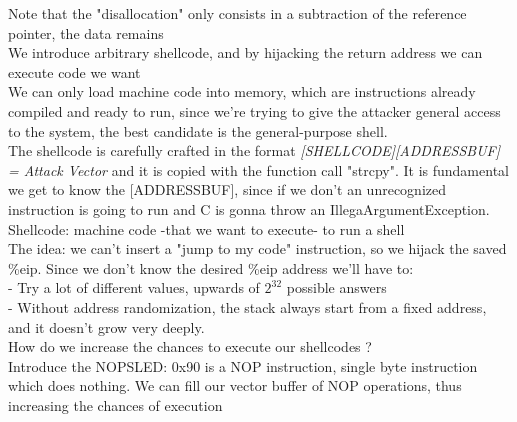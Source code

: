 \documentclass[11pt, oneside]{article}   	%
\begin{document}
{\footnotesize Note that the "disallocation" only consists in a subtraction of the reference pointer, the data remains\\
We introduce arbitrary shellcode, and by hijacking the return address we can execute code we want}\\
We can only load machine code into memory, which are instructions already compiled and ready to run, since we're trying to give the attacker general access to the system, the best candidate is the general-purpose shell. \\The shellcode is carefully crafted in the format \emph{[SHELLCODE][ADDRESSBUF] = Attack Vector} and it is copied with the function call "strcpy".
It is fundamental we get to know the [ADDRESSBUF], since if we don't an unrecognized instruction is going to run and C is gonna throw an IllegaArgumentException.\\
{\footnotesize Shellcode: machine code -that we want to execute- to run a shell}\\
The idea: we can't insert a "jump to my code" instruction, so we hijack the saved \%eip. Since we don't know the desired \%eip address we'll have to:\\
- Try a lot of different values, upwards of $2^{32}$ possible answers\\
- Without address randomization, the stack always start from a fixed address, and it doesn't grow very deeply.\\
How do we increase the chances to execute our shellcodes ?\\
Introduce the NOPSLED: 0x90 is a NOP instruction, single byte instruction which does nothing.
We can fill our vector buffer of NOP operations, thus increasing the chances of execution
\end{document}
